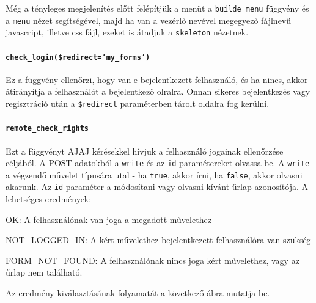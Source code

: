\documentclass[12pt,a4paper,twoside]{article}
\newcommand{\desc}{
  \begin{description}{}{}
    \setlength\itemsep{0pt}
    \setlength\parskip{0pt}
    \setlength\topsep{0pt}
    \setlength\partopsep{0pt}
    \small}
\newcommand{\ed}{
  \end{description}
  \normalsize }
\begin{document}
Még a tényleges megjelenítés előtt felépítjük a menüt a \texttt{builde\_menu}
függvény és a \texttt{menu} nézet segítségével, majd ha van a vezérlő nevével
megegyező fájlnevű javascript, illetve css fájl, ezeket is átadjuk a
\texttt{skeleton} nézetnek.

\paragraph{\texttt{check\_login(\$redirect='my\_forms')}}
Ez a függvény ellenőrzi, hogy van-e bejelentkezett felhasználó, és ha nincs,
akkor átirányítja a felhasználót a bejelentkező olralra. Onnan sikeres
bejelentkezés vagy regisztráció után a \texttt{\$redirect} paraméterben tárolt
oldalra fog kerülni.

\paragraph{\texttt{remote\_check\_rights}}

Ezt a függvényt AJAJ kérésekkel hívjuk a felhasználó jogainak ellenőrzése
céljából. A POST adatokból a \texttt{write} és az \texttt{id} paramétereket
olvassa be. A \texttt{write} a végzendő művelet típusára utal - ha
\texttt{true}, akkor írni, ha \texttt{false}, akkor olvasni akarunk.
Az \texttt{id} paraméter a módosítani vagy olvasni kívánt űrlap azonosítója.
A lehetséges eredmények:

\desc
  \item[OK:] A felhasználónak van joga a megadott művelethez
  \item[NOT\_LOGGED\_IN:] A kért művelethez bejelentkezett felhasználóra van szükség
  \item[FORM\_NOT\_FOUND:] A felhasználónak nincs joga kért művelethez, vagy az űrlap
    nem található.
\ed

Az eredmény kiválasztásának folyamatát a következő ábra mutatja be.
\end{document}
